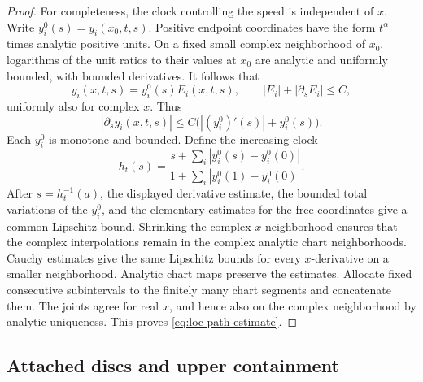 \begin{proof}
For completeness, the clock controlling the speed is independent of $x$.  Write $y_i^0(s)=y_i(x_0,t,s)$.  Positive endpoint coordinates have the form $t^\alpha$ times analytic positive units.  On a fixed small complex neighborhood of $x_0$, logarithms of the unit ratios to their values at $x_0$ are analytic and uniformly bounded, with bounded derivatives.  It follows that
\[
 y_i(x,t,s)=y_i^0(s)E_i(x,t,s),\qquad
 |E_i|+|\partial_s E_i|\leq C,
\]
uniformly also for complex $x$.  Thus
\[
 |\partial_s y_i(x,t,s)|
           \leq C\bigl(|(y_i^0)'(s)|+y_i^0(s)\bigr).
\]
Each $y_i^0$ is monotone and bounded.  Define the increasing clock
\[
 h_t(s)=
 \frac{s+\sum_i|y_i^0(s)-y_i^0(0)|}
 {1+\sum_i|y_i^0(1)-y_i^0(0)|}.
\]
After $s=h_t^{-1}(a)$, the displayed derivative estimate, the bounded total variations of the $y_i^0$, and the elementary estimates for the free coordinates give a common Lipschitz bound.  Shrinking the complex $x$ neighborhood ensures that the complex interpolations remain in the complex analytic chart neighborhoods.  Cauchy estimates give the same Lipschitz bounds for every $x$-derivative on a smaller neighborhood. Analytic chart maps preserve the estimates.  Allocate fixed consecutive subintervals to the finitely many chart segments and concatenate them. The joints agree for real $x$, and hence also on the complex neighborhood by analytic uniqueness.  This proves \eqref{eq:loc-path-estimate}.
\end{proof}

\subsection{Attached discs and upper containment}

